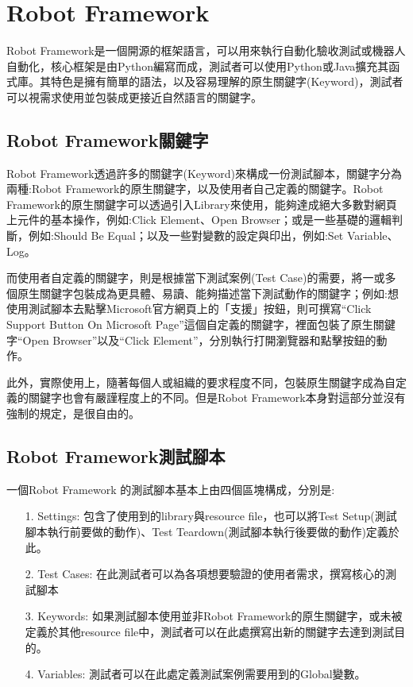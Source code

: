 \hspace*{\fill} \\
\\ \hspace*{\fill} \\
\\ \hspace*{\fill} \\
\section{Robot Framework}
Robot Framework\cite{rf}\cite{rfguide}是一個開源的框架語言，可以用來執行自動化驗收測試或機器人自動化，核心框架是由Python\cite{python}編寫而成，測試者可以使用Python或Java擴充其函式庫。其特色是擁有簡單的語法，以及容易理解的原生關鍵字(Keyword)，測試者可以視需求使用並包裝成更接近自然語言的關鍵字。

\subsection{Robot Framework關鍵字}
Robot Framework透過許多的關鍵字(Keyword)來構成一份測試腳本，關鍵字分為兩種:Robot Framework的原生關鍵字，以及使用者自己定義的關鍵字。Robot Framework的原生關鍵字可以透過引入Library來使用，能夠達成絕大多數對網頁上元件的基本操作，例如:Click Element、Open Browser；或是一些基礎的邏輯判斷，例如:Should Be Equal；以及一些對變數的設定與印出，例如:Set Variable、Log。

而使用者自定義的關鍵字，則是根據當下測試案例(Test Case)的需要，將一或多個原生關鍵字包裝成為更具體、易讀、能夠描述當下測試動作的關鍵字；例如:想使用測試腳本去點擊Microsoft官方網頁上的「支援」按鈕，則可撰寫“Click Support Button On Microsoft Page”這個自定義的關鍵字，裡面包裝了原生關鍵字“Open Browser”以及“Click Element”，分別執行打開瀏覽器和點擊按鈕的動作。

此外，實際使用上，隨著每個人或組織的要求程度不同，包裝原生關鍵字成為自定義的關鍵字也會有嚴謹程度上的不同。但是Robot Framework本身對這部分並沒有強制的規定，是很自由的。

\subsection{Robot Framework測試腳本}
一個Robot Framework 的測試腳本基本上由四個區塊構成，分別是:
\begin{itemize}
    \item[1.]Settings: 包含了使用到的library與resource file，也可以將Test Setup(測試腳本執行前要做的動作)、Test Teardown(測試腳本執行後要做的動作)定義於此。
    \item[2.]Test Cases: 在此測試者可以為各項想要驗證的使用者需求，撰寫核心的測試腳本
    \item[3.]Keywords: 如果測試腳本使用並非Robot Framework的原生關鍵字，或未被定義於其他resource file中，測試者可以在此處撰寫出新的關鍵字去達到測試目的。
    \item[4.]Variables: 測試者可以在此處定義測試案例需要用到的Global變數。 
\end{itemize}

